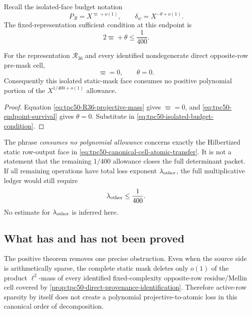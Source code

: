 Recall the isolated-face budget notation
\begin{equation}
 P_{\mathscr R}=X^{\varpi+o(1)},
 \qquad
 \delta_w=X^{-\theta+o(1)}.
 \label{eq:tpc50-budget-parameters}
\end{equation}
The fixed-representation sufficient condition at this endpoint is
\begin{equation}
 2\varpi+\theta\leq\frac1{400}.
 \label{eq:tpc50-isolated-budget-condition}
\end{equation}

\begin{corollary}
\label{cor:tpc50-endpoint-zero-cost}
For the representation \(\mathscr R_{36}\) and every identified
nondegenerate direct opposite-row pre-mask cell,
\begin{equation}
 \varpi=0,
 \qquad
 \theta=0.
 \label{eq:tpc50-zero-loss-exponents}
\end{equation}
Consequently this isolated static-mask face consumes no positive
polynomial portion of the \(X^{1/400+o(1)}\) allowance.
\end{corollary}

\begin{proof}
Equation \eqref{eq:tpc50-R36-projective-mass} gives \(\varpi=0\), and
\eqref{eq:tpc50-endpoint-survival} gives \(\theta=0\).  Substitute in
\eqref{eq:tpc50-isolated-budget-condition}.
\end{proof}

The phrase \emph{consumes no polynomial allowance} concerns exactly
the Hilbertized static row-output face in
\eqref{eq:tpc50-canonical-cell-atomic-transfer}.  It is not a statement
that the remaining \(1/400\) allowance closes the full determinant
packet.  If all remaining operations have total loss exponent
\(\lambda_{\rm other}\), the full multiplicative ledger would still
require
\begin{equation}
 \lambda_{\rm other}\leq\frac1{400}.
 \label{eq:tpc50-remaining-budget}
\end{equation}
No estimate for \(\lambda_{\rm other}\) is inferred here.

\subsection{What has and has not been proved}

The positive theorem removes one precise obstruction.  Even when the
source side is arithmetically sparse, the complete static mask deletes
only \(o(1)\) of the product \(\ell^2\)-mass of every identified
fixed-complexity opposite-row residue/Mellin cell covered by
\cref{prop:tpc50-direct-provenance-identification}.  Therefore
active-row sparsity by itself does not create a polynomial
projective-to-atomic loss in this canonical order of decomposition.

